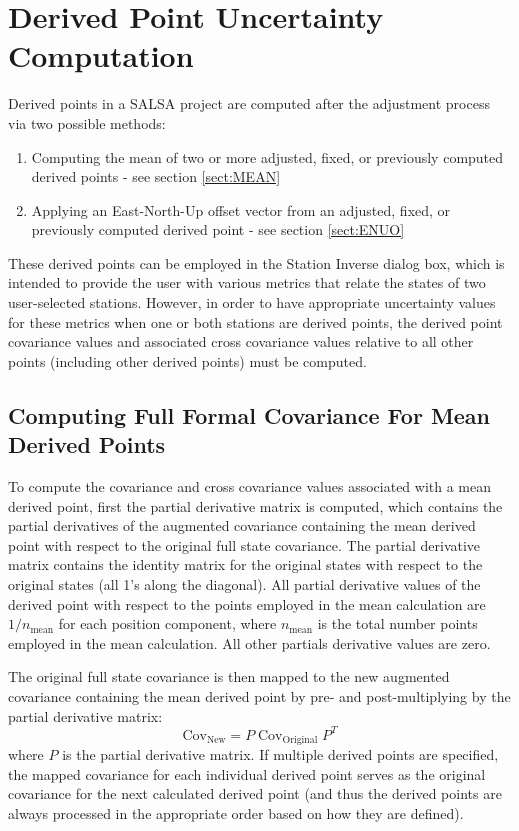 \chapter{Derived Point Uncertainty Computation} \label{appendices:DerPtUncMapping}

Derived points in a SALSA project are computed after the adjustment process via two possible methods: 
\begin{enumerate}
	\item Computing the mean of two or more adjusted, fixed, or previously computed derived points - see section \ref{sect:MEAN}
	\item Applying an East-North-Up offset vector from an adjusted, fixed, or previously computed derived point - see section \ref{sect:ENUO}
\end{enumerate}

These derived points can be employed in the Station Inverse dialog box, which is intended to provide the user with various metrics that relate the states of two user-selected stations.  However, in order to have appropriate uncertainty values for these metrics when one or both stations are derived points, the derived point covariance values and associated cross covariance values relative to all other points (including other derived points) must be computed.  

\section*{Computing Full Formal Covariance For Mean Derived Points}

To compute the covariance and cross covariance values associated with a mean derived point, first the partial derivative matrix is computed, which contains the partial derivatives of the augmented covariance containing the mean derived point with respect to the original full state covariance.  The partial derivative matrix contains the identity matrix for the original states with respect to the original states (all 1's along the diagonal).  All partial derivative values of the derived point with respect to the points employed in the mean calculation are $1/n_{\text{mean}}$ for each position component, where $n_{\text{mean}}$ is the total number points employed in the mean calculation.  All other partials derivative values are zero. 

The original full state covariance is then mapped to the new augmented covariance containing the mean derived point by pre- and post-multiplying by the partial derivative matrix:
\begin{equation}\label{eq:CovMapping}
\text{Cov}_{\text{New}} = P \; \text{Cov}_{\text{Original}} \; P^T
\end{equation}
where $P$ is the partial derivative matrix. If multiple derived points are specified, the mapped covariance for each individual derived point serves as the original covariance for the next calculated derived point (and thus the derived points are always processed in the appropriate order based on how they are defined).

